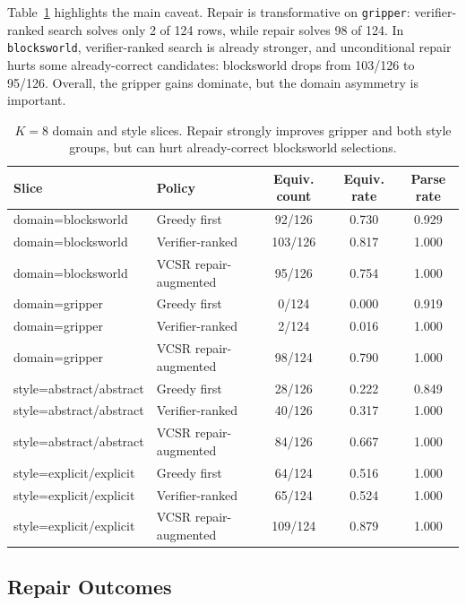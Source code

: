 \documentclass[11pt]{article}
\newcommand{\vcsr}{\textsc{VCSR}\xspace}
\begin{document}
Table~\ref{tab:slices} highlights the main caveat. Repair is transformative on
\texttt{gripper}: verifier-ranked search solves only 2 of 124 rows, while repair
solves 98 of 124. In \texttt{blocksworld}, verifier-ranked search is already
stronger, and unconditional repair hurts some already-correct candidates:
blocksworld drops from 103/126 to 95/126. Overall, the gripper gains dominate,
but the domain asymmetry is important.

\begin{table}[t]
\centering
\small
\begin{tabular}{llccc}
\toprule
Slice & Policy & Equiv. count & Equiv. rate & Parse rate \\
\midrule
domain=blocksworld & Greedy first & 92/126 & 0.730 & 0.929 \\
domain=blocksworld & Verifier-ranked & 103/126 & 0.817 & 1.000 \\
domain=blocksworld & \vcsr repair-augmented & 95/126 & 0.754 & 1.000 \\
\midrule
domain=gripper & Greedy first & 0/124 & 0.000 & 0.919 \\
domain=gripper & Verifier-ranked & 2/124 & 0.016 & 1.000 \\
domain=gripper & \vcsr repair-augmented & 98/124 & 0.790 & 1.000 \\
\midrule
style=abstract/abstract & Greedy first & 28/126 & 0.222 & 0.849 \\
style=abstract/abstract & Verifier-ranked & 40/126 & 0.317 & 1.000 \\
style=abstract/abstract & \vcsr repair-augmented & 84/126 & 0.667 & 1.000 \\
\midrule
style=explicit/explicit & Greedy first & 64/124 & 0.516 & 1.000 \\
style=explicit/explicit & Verifier-ranked & 65/124 & 0.524 & 1.000 \\
style=explicit/explicit & \vcsr repair-augmented & 109/124 & 0.879 & 1.000 \\
\bottomrule
\end{tabular}
\caption{$K=8$ domain and style slices. Repair strongly improves gripper and
both style groups, but can hurt already-correct blocksworld selections.}
\label{tab:slices}
\end{table}

\subsection{Repair Outcomes}
\end{document}
